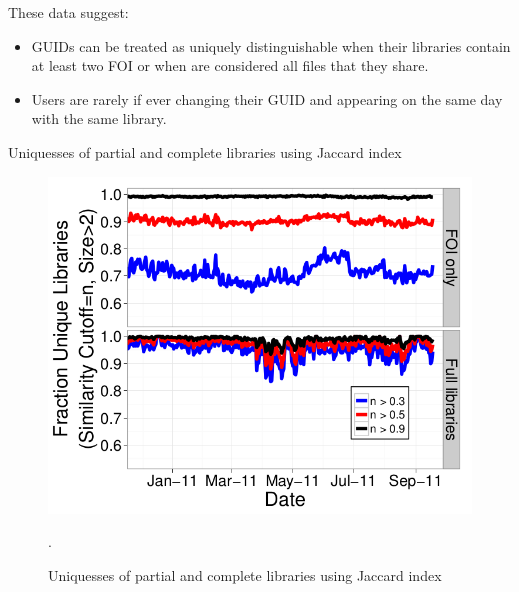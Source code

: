 \documentclass[notes]{beamer}
\begin{document}
\begin{frame}

\begin{block}{These data suggest:}

\begin{itemize}

\item[\checkmark]GUIDs can be treated as uniquely distinguishable when their libraries contain at least two FOI or when are considered all files that they share. 

\item[\checkmark] Users are rarely if ever changing their GUID and appearing on the same day with the same library. 

\end{itemize}

\end{block}

\end{frame}

\begin{frame}

\begin{block}{Uniquesses of partial and complete libraries using Jaccard index $ $}

\begin{figure}[!htb]
\centering
\includegraphics[scale=0.25]{Libraries_unique}
\caption{Uniquesses of partial and complete libraries using Jaccard index}.
\label{fig:Libraries_unique}
\end{figure}

\end{block}

\end{frame}
\end{document}
